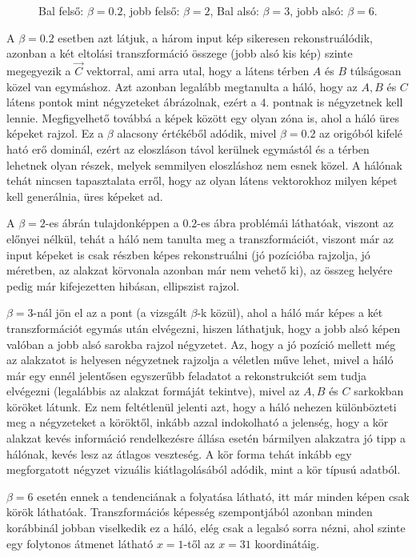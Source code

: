 \begin{figure}[h!]
\begin{center}
  \caption{Bal felső: $\beta=0.2$, jobb felső: $\beta=2$, Bal alsó: $\beta=3$, jobb alsó: $\beta=6$.}\label{interp}
\end{center}
\end{figure}

A $\beta=0.2$ esetben azt látjuk, a három input kép sikeresen rekonstruálódik, azonban a két eltolási transzformáció összege (jobb alsó kis kép) szinte megegyezik a $\vec{C}$ vektorral, ami arra utal, hogy a látens térben $A$ és $B$ túlságosan közel van egymáshoz. Azt azonban legalább megtanulta a háló, hogy az $A, B$ és $C$ látens pontok mint négyzeteket ábrázolnak, ezért a $4$. pontnak is négyzetnek kell lennie. Megfigyelhető továbbá a képek között egy olyan zóna is, ahol a háló üres képeket rajzol. Ez a $\beta$ alacsony értékéből adódik, mivel $\beta=0.2$ az origóból kifelé ható erő dominál, ezért az eloszláson távol kerülnek egymástól és a térben lehetnek olyan részek, melyek semmilyen eloszláshoz nem esnek közel. A hálónak tehát nincsen tapasztalata erről, hogy az olyan látens vektorokhoz milyen képet kell generálnia, üres képeket ad.

A $\beta=2$-es ábrán tulajdonképpen a $0.2$-es ábra problémái láthatóak, viszont az előnyei nélkül, tehát a háló nem tanulta meg a transzformációt, viszont már az input képeket is csak részben képes rekonstruálni (jó pozícióba rajzolja, jó méretben, az alakzat körvonala azonban már nem vehető ki), az összeg helyére pedig már kifejezetten hibásan, ellipszist rajzol.

$\beta=3$-nál jön el az a pont (a vizsgált $\beta$-k közül), ahol a háló már képes a két transzformációt egymás után elvégezni, hiszen láthatjuk, hogy a jobb alsó képen valóban a jobb alsó sarokba rajzol négyzetet. Az, hogy a jó pozíció mellett még az alakzatot is helyesen négyzetnek rajzolja a véletlen műve lehet, mivel a háló már egy ennél jelentősen egyszerűbb feladatot a rekonstrukciót sem tudja elvégezni (legalábbis az alakzat formáját tekintve), mivel az $A, B$ és $C$ sarkokban köröket látunk. Ez nem feltétlenül jelenti azt, hogy a háló nehezen különbözteti meg a négyzeteket a köröktől, inkább azzal indokolható a jelenség, hogy a kör alakzat kevés információ rendelkezésre állása esetén bármilyen alakzatra jó tipp a hálónak, kevés lesz az átlagos veszteség. A kör forma tehát inkább egy megforgatott négyzet vizuális kiátlagolásából adódik, mint a kör típusú adatból.

$\beta=6$ esetén ennek a tendenciának a folyatása látható, itt már minden képen csak körök láthatóak. Transzformációs képesség szempontjából azonban minden korábbinál jobban viselkedik ez a háló, elég csak a legalsó sorra nézni, ahol szinte egy folytonos átmenet látható $x=1$-től az $x=31$ koordinátáig.

